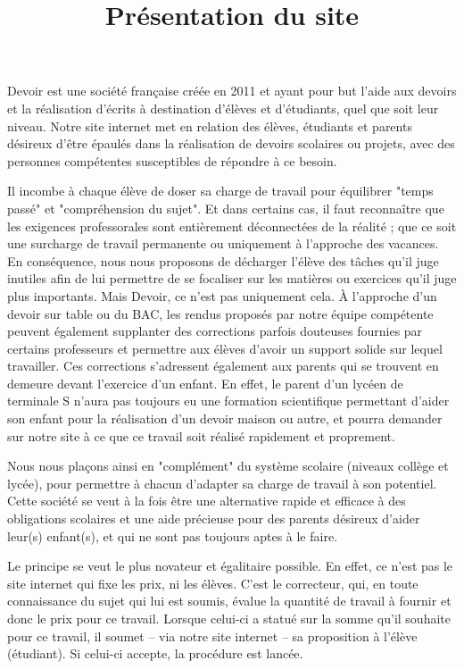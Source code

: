 \documentclass[a4paper,10pt]{article}
\title{Présentation du site \eDevoir}
\author{\eDevoir}
\newcommand{\eDevoir}{\rotatebox[origin=c]{15}{e}Devoir\xspace}
\begin{document}
\maketitle
\thispagestyle{empty}
\pagestyle{empty}

\eDevoir est une société française créée en 2011 et ayant pour but l'aide aux devoirs et la réalisation d'écrits à destination d'élèves et d'étudiants, quel que soit leur niveau. Notre site internet met en relation des élèves, étudiants et parents désireux d'être épaulés dans la réalisation de devoirs scolaires ou projets, avec des personnes compétentes susceptibles de répondre à ce besoin.

Il incombe à chaque élève de doser sa charge de travail pour équilibrer "temps passé" et "compréhension du sujet". Et dans certains cas, il faut reconnaître que les exigences professorales sont entièrement déconnectées de la réalité ; que ce soit une surcharge de travail permanente ou uniquement à l'approche des vacances. En conséquence, nous nous proposons de décharger l'élève des tâches qu'il juge inutiles afin de lui permettre de se focaliser sur les matières ou exercices qu'il juge plus importants.
Mais \eDevoir, ce n'est pas uniquement cela. À l'approche d'un devoir sur table ou du BAC, les rendus proposés par notre équipe compétente peuvent également supplanter des corrections parfois douteuses fournies par certains professeurs et permettre aux élèves d'avoir un support solide sur lequel travailler.
Ces corrections s'adressent également aux parents qui se trouvent en demeure devant l'exercice d'un enfant. En effet, le parent d'un lycéen de terminale S n'aura pas toujours eu une formation scientifique permettant d'aider son enfant pour la réalisation d'un devoir maison ou autre, et pourra demander sur notre site à ce que ce travail soit réalisé rapidement et proprement.

Nous nous plaçons ainsi en "complément" du système scolaire (niveaux collège et lycée), pour permettre à chacun d'adapter sa charge de travail à son potentiel. Cette société se veut à la fois être une alternative rapide et efficace à des obligations scolaires et une aide précieuse pour des parents désireux d'aider leur(s) enfant(s), et qui ne sont pas toujours aptes à le faire.

Le principe se veut le plus novateur et égalitaire possible. En effet, ce n'est pas le site internet qui fixe les prix, ni les élèves. C'est le correcteur, qui, en toute connaissance du sujet qui lui est soumis, évalue la quantité de travail à fournir et donc le prix pour ce travail. Lorsque celui-ci a statué sur la somme qu'il souhaite pour ce travail, il soumet -- via notre site internet -- sa proposition à l'élève (étudiant). Si celui-ci accepte, la procédure est lancée.\\
\end{document}

